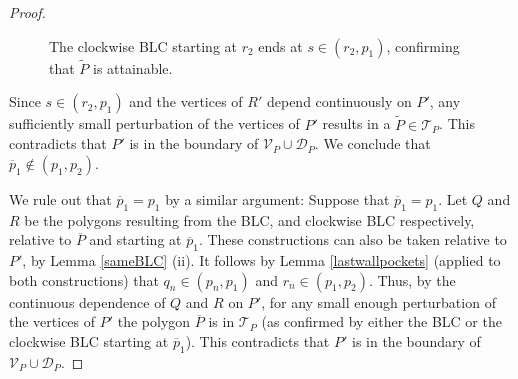 \documentclass[11pt]{amsart}
\theoremstyle{remark}
\numberwithin{equation}{section}
\newcommand{\D}{\mathcal{D}}
\newcommand{\TT}{\mathcal{T}}
\newcommand{\V}{\mathcal{V}}
\begin{document}
\begin{proof}
\begin{figure}

\caption{The clockwise BLC starting at $r_2$ ends at $s\in (r_2,p_1)$, confirming that $\widetilde P$ is attainable.}

\label{figboundarypoly}
\end{figure}



Since $s\in (r_2,p_1)$ and the vertices of $R'$ depend continuously on $P'$, any sufficiently small perturbation of the vertices of $P'$ results in a $\widetilde P\in \TT_P$. This contradicts that $P'$ is in the boundary of $\V_P\cup \D_P$. We conclude that $\overline p_1 \notin (p_1,p_2)$.

We rule out that $\overline p_1=p_1$ by a similar argument:
Suppose that $\overline{p}_1=p_1$. Let $Q$ and $R$ be the polygons resulting from the BLC, and clockwise BLC respectively, relative to $\overline P$ and starting at
$\overline p_1$. These constructions can also be taken relative to $P'$, by Lemma \ref{sameBLC} (ii). It follows by Lemma \ref{lastwallpockets}  (applied to both constructions) that  $q_n\in(p_n,p_1)$ and $r_n\in(p_1,p_2)$. Thus, by the continuous dependence of $Q$ and
 $R$ on $P'$, for any small enough perturbation of the vertices of $P'$ the polygon $\overline P$ is in $\TT_P$ (as confirmed by either the BLC or the clockwise BLC starting at $\overline p_1$). This contradicts that $P'$ is in the boundary of $\V_P\cup \D_P$.



\end{proof}
\end{document}
